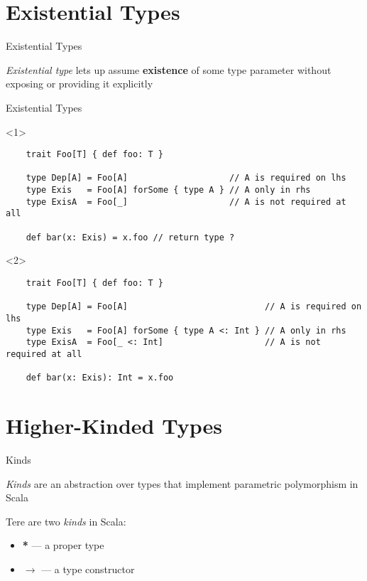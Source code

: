 \documentclass[aspectratio=169]{beamer}
\begin{document}
\section{Existential Types}
\begin{frame}{Existential Types}
  \begin{block}{}
    \textit{Existential type} lets up assume \textbf{existence} of some type parameter without
    exposing or providing it explicitly\cite{exis-adv}
  \end{block}
\end{frame}

\begin{frame}[fragile]{Existential Types}
  \begin{onlyenv}<1>
    \begin{verbatim}
    trait Foo[T] { def foo: T }
    
    type Dep[A] = Foo[A]                    // A is required on lhs
    type Exis   = Foo[A] forSome { type A } // A only in rhs
    type ExisA  = Foo[_]                    // A is not required at all
    
    def bar(x: Exis) = x.foo // return type ?
    \end{verbatim}
  \end{onlyenv}
\begin{onlyenv}<2>
    \begin{verbatim}
    trait Foo[T] { def foo: T }
    
    type Dep[A] = Foo[A]                           // A is required on lhs
    type Exis   = Foo[A] forSome { type A <: Int } // A only in rhs
    type ExisA  = Foo[_ <: Int]                    // A is not required at all
    
    def bar(x: Exis): Int = x.foo
    \end{verbatim}
  \end{onlyenv}
\end{frame}

\section{Higher-Kinded Types}

\begin{frame}{Kinds}
  \begin{block}{}
    \textit{Kinds} are an abstraction over types that implement parametric polymorphism in Scala
  \end{block}
  \bigskip
  Tere are two \textit{kinds} in Scala:
  \begin{itemize}
    \item \textbf{*} --- a proper type
    \item $\rightarrow$ --- a type constructor
  \end{itemize}
\end{frame}
\end{document}
